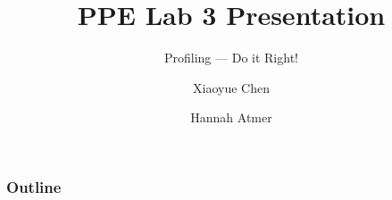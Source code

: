 \documentclass{beamer}
\title{PPE Lab 3 Presentation}
\subtitle{Profiling --- Do it Right!}
\author{Xiaoyue Chen \and Hannah Atmer}
\begin{document}
\begin{frame}
  \titlepage
\end{frame}

\begin{frame}
  \frametitle{Outline}
  \tableofcontents
\end{frame}




\end{document}
